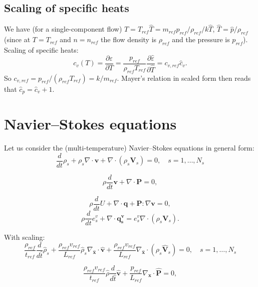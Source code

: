 \documentclass[a4paper,11pt,english]{article}
\begin{document}
\subsection{Scaling of specific heats}
We have (for a single-component flow) $T=T_{ref} \hat{T} = m_{ref} p_{ref} / \rho_{ref} / k \hat{T}$, $\hat{T} = \hat{p}/\rho_{ref}$ (since at $T=T_{ref}$ and $n=n_{ref}$ the flow density is $\rho_{ref}$ and the pressure is $p_{ref}$).
Scaling of specific heats:
\begin{equation}
    c_v(T) = \frac{\partial \varepsilon}{\partial T} = \frac{p_{ref}}{\rho_{ref}T_{ref}}\frac{\partial \hat{\varepsilon}}{\partial \hat{T}}=c_{v,ref} \hat{c}_{v}.
\end{equation}
So $c_{v,ref}=p_{ref} / (\rho_{ref}T_{ref}) = k / m_{ref}$. Mayer's relation in scaled form then reads that $\hat{c}_p = \hat{c}_v + 1$.

\section{Navier--Stokes equations}
Let us consider the (multi-temperature) Navier--Stokes equations in general form:
\begin{equation}
     \frac{d}{dt}\rho_s + \rho_s \nabla \cdot \mathbf{v} + \nabla \cdot (\rho_s \mathbf{V}_s) = 0,\quad s=1,\ldots,N_s
\end{equation}

\begin{equation}
     \rho \frac{d}{dt}\mathbf{v} + \nabla \cdot \mathbf{P} = 0,
\end{equation}

\begin{equation}
     \rho \frac{d}{dt}{U} + \nabla \cdot \mathbf{q} + \mathbf{P} : \nabla \mathbf{v} = 0,
\end{equation}
\begin{equation}
     \rho \frac{d}{dt}{e^v_s} + \nabla \cdot \mathbf{q^v_s} = e^v_s \nabla \cdot (\rho_s \mathbf{V}_s).
\end{equation}

With scaling:
\begin{equation}
    \frac{\rho_{ref}}{t_{ref}} \frac{d}{d\hat{t}}\hat{\rho}_s + \frac{\rho_{ref} v_{ref}}{L_{ref}} \hat{\rho}_s \nabla_{\hat{\mathbf{x}}} \cdot \hat{\mathbf{v}} + \frac{\rho_{ref}v_{ref}}{L_{ref}}\nabla_{\hat{\mathbf{x}}} \cdot (\rho_s \hat{\mathbf{V}}_s) = 0,\quad s=1,\ldots,N_s
\end{equation}

\begin{equation}
     \frac{\rho_{ref}v_{ref}}{t_{ref}} \hat{\rho} \frac{d}{d\hat{t}}\hat{\mathbf{v}} + \frac{p_{ref}}{L_{ref}}\nabla_{\hat{\mathbf{x}}} \cdot \hat{\mathbf{P}} = 0,
\end{equation}
\end{document}
